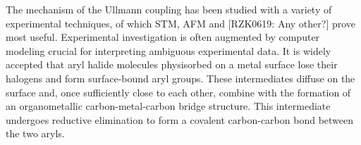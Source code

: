 \documentclass[%
 reprint,
 amsmath,amssymb,
 aps,
prb,
floatfix,
]{revtex4-2}
\newcommand{\lock}{\color{red}}
\newcommand{\lock}{\color{black}}
\newcommand{\comm}{\color{ForestGreen}} %
\newcommand{\sinfo}{Supplementary Information}
\begin{document}

{\lock

The mechanism of the Ullmann coupling has been studied with a variety of experimental techniques, of which STM, AFM and {\comm[RZK0619: Any other?]} prove most useful. Experimental investigation is often augmented by computer modeling crucial for interpreting ambiguous experimental data.
%
%
%
It is widely accepted that aryl halide molecules physisorbed on a metal surface lose their halogens and form surface-bound aryl groups. These intermediates diffuse on the surface and, once sufficiently close to each other, combine with the formation of an organometallic carbon-metal-carbon bridge structure. This intermediate undergoes reductive elimination to form a covalent carbon-carbon bond between the two aryls. %


}%
\end{document}
